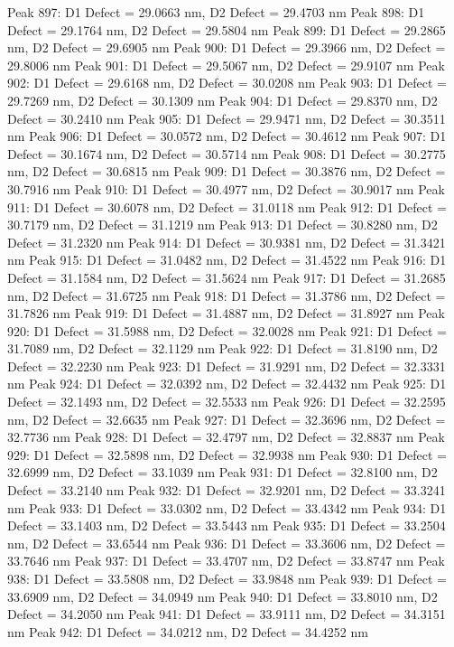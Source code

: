 \documentclass{article}
\begin{document}
Peak 897: D1 Defect = 29.0663 nm, D2 Defect = 29.4703 nm
Peak 898: D1 Defect = 29.1764 nm, D2 Defect = 29.5804 nm
Peak 899: D1 Defect = 29.2865 nm, D2 Defect = 29.6905 nm
Peak 900: D1 Defect = 29.3966 nm, D2 Defect = 29.8006 nm
Peak 901: D1 Defect = 29.5067 nm, D2 Defect = 29.9107 nm
Peak 902: D1 Defect = 29.6168 nm, D2 Defect = 30.0208 nm
Peak 903: D1 Defect = 29.7269 nm, D2 Defect = 30.1309 nm
Peak 904: D1 Defect = 29.8370 nm, D2 Defect = 30.2410 nm
Peak 905: D1 Defect = 29.9471 nm, D2 Defect = 30.3511 nm
Peak 906: D1 Defect = 30.0572 nm, D2 Defect = 30.4612 nm
Peak 907: D1 Defect = 30.1674 nm, D2 Defect = 30.5714 nm
Peak 908: D1 Defect = 30.2775 nm, D2 Defect = 30.6815 nm
Peak 909: D1 Defect = 30.3876 nm, D2 Defect = 30.7916 nm
Peak 910: D1 Defect = 30.4977 nm, D2 Defect = 30.9017 nm
Peak 911: D1 Defect = 30.6078 nm, D2 Defect = 31.0118 nm
Peak 912: D1 Defect = 30.7179 nm, D2 Defect = 31.1219 nm
Peak 913: D1 Defect = 30.8280 nm, D2 Defect = 31.2320 nm
Peak 914: D1 Defect = 30.9381 nm, D2 Defect = 31.3421 nm
Peak 915: D1 Defect = 31.0482 nm, D2 Defect = 31.4522 nm
Peak 916: D1 Defect = 31.1584 nm, D2 Defect = 31.5624 nm
Peak 917: D1 Defect = 31.2685 nm, D2 Defect = 31.6725 nm
Peak 918: D1 Defect = 31.3786 nm, D2 Defect = 31.7826 nm
Peak 919: D1 Defect = 31.4887 nm, D2 Defect = 31.8927 nm
Peak 920: D1 Defect = 31.5988 nm, D2 Defect = 32.0028 nm
Peak 921: D1 Defect = 31.7089 nm, D2 Defect = 32.1129 nm
Peak 922: D1 Defect = 31.8190 nm, D2 Defect = 32.2230 nm
Peak 923: D1 Defect = 31.9291 nm, D2 Defect = 32.3331 nm
Peak 924: D1 Defect = 32.0392 nm, D2 Defect = 32.4432 nm
Peak 925: D1 Defect = 32.1493 nm, D2 Defect = 32.5533 nm
Peak 926: D1 Defect = 32.2595 nm, D2 Defect = 32.6635 nm
Peak 927: D1 Defect = 32.3696 nm, D2 Defect = 32.7736 nm
Peak 928: D1 Defect = 32.4797 nm, D2 Defect = 32.8837 nm
Peak 929: D1 Defect = 32.5898 nm, D2 Defect = 32.9938 nm
Peak 930: D1 Defect = 32.6999 nm, D2 Defect = 33.1039 nm
Peak 931: D1 Defect = 32.8100 nm, D2 Defect = 33.2140 nm
Peak 932: D1 Defect = 32.9201 nm, D2 Defect = 33.3241 nm
Peak 933: D1 Defect = 33.0302 nm, D2 Defect = 33.4342 nm
Peak 934: D1 Defect = 33.1403 nm, D2 Defect = 33.5443 nm
Peak 935: D1 Defect = 33.2504 nm, D2 Defect = 33.6544 nm
Peak 936: D1 Defect = 33.3606 nm, D2 Defect = 33.7646 nm
Peak 937: D1 Defect = 33.4707 nm, D2 Defect = 33.8747 nm
Peak 938: D1 Defect = 33.5808 nm, D2 Defect = 33.9848 nm
Peak 939: D1 Defect = 33.6909 nm, D2 Defect = 34.0949 nm
Peak 940: D1 Defect = 33.8010 nm, D2 Defect = 34.2050 nm
Peak 941: D1 Defect = 33.9111 nm, D2 Defect = 34.3151 nm
Peak 942: D1 Defect = 34.0212 nm, D2 Defect = 34.4252 nm
\end{document}
